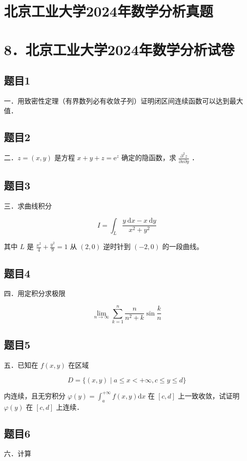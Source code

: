 \documentclass{article}
\begin{document}
\section*{北京工业大学2024年数学分析真题}
\section*{8．北京工业大学2024年数学分析试卷}

\subsection{题目1}
一．用致密性定理（有界数列必有收敛子列）证明闭区间连续函数可以达到最大值．

\subsection{题目2}
二．\(z=(x, y)\) 是方程 \(x+y+z=\mathrm{e}^{z}\) 确定的隐函数，求 \(\frac{\partial^{2} z}{\partial x \partial y}\) ．

\subsection{题目3}
三．求曲线积分

\[
I=\int_{L} \frac{y \mathrm{~d} x-x \mathrm{~d} y}{x^{2}+y^{2}}
\]

其中 \(L\) 是 \(\frac{x^{2}}{4}+\frac{y^{2}}{9}=1\) 从 \((2,0)\) 逆时针到 \((-2,0)\) 的一段曲线。

\subsection{题目4}
四．用定积分求极限

\[
\lim _{n \rightarrow \infty} \sum_{k=1}^{n} \frac{n}{n^{2}+k} \sin \frac{k}{n}
\]

\subsection{题目5}
五．已知在 \(f(x, y)\) 在区域

\[
D=\{(x, y) \mid a \leq x<+\infty, c \leq y \leq d\}
\]

内连续，且无穷积分 \(\varphi(y)=\int_{a}^{+\infty} f(x, y) \mathrm{d} x\) 在 \([c, d]\) 上一致收敛，试证明 \(\varphi(y)\) 在 \([c, d]\) 上连续．

\subsection{题目6}
六．计算
\end{document}
